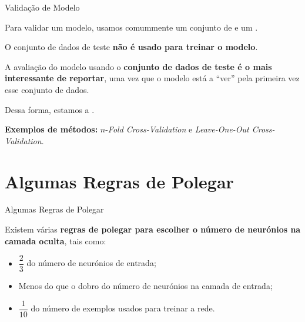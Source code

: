 \begin{frame}{Validação de Modelo}

    Para validar um modelo, usamos comummente um conjunto de  e um .

    \medskip
    
    O conjunto de dados de teste \textbf{não é usado para treinar o modelo}.

    \pauseskip
    
    A avaliação do modelo usando o \textbf{conjunto de dados de teste é o mais interessante de reportar}, uma vez que o modelo está a \enquote{ver} pela primeira vez esse conjunto de dados.

    \medskip
    
    Dessa forma, estamos a . 
    
    \textbf{Exemplos de métodos:} $n$-\textit{Fold Cross-Validation} e \textit{Leave-One-Out Cross-Validation}. 

\end{frame}

\section{Algumas Regras de Polegar}

\begin{frame}{Algumas Regras de Polegar}

    
    \pauseskip
    
    Existem várias \textbf{regras de polegar para escolher o número de neurónios na camada oculta}, tais como:
    \begin{itemize}
        \item $\dfrac{2}{3}$ do número de neurónios de entrada;
        \medskip
        \item Menos do que o dobro do número de neurónios na camada de entrada;
        \medskip
        \item $\dfrac{1}{10}$ do número de exemplos usados para treinar a rede.
    \end{itemize}

\end{frame}

